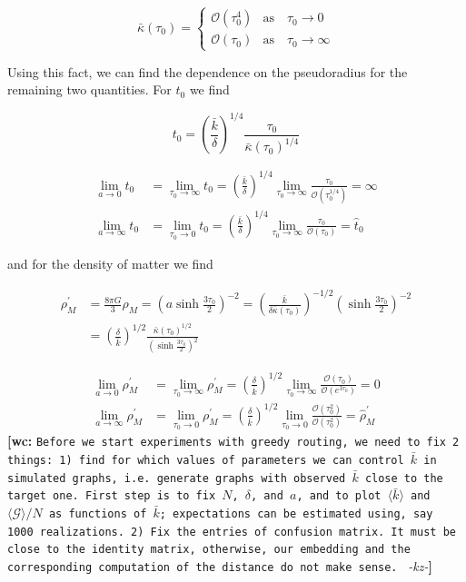 \documentclass[preprint,notitlepage,amsmath,amssymb,floatfix]{revtex4-1}
\newcommand{\XXX}[3]{{\bf [#1: } {\tt #3} {\it -#2-}{\bf ]}}
\begin{document}
\begin{equation}
\bar{\kappa}\left(\tau_0\right) = 
\begin{cases}
\mathcal{O}\left(\tau_0^4\right) & \mathrm{as}\quad \tau_0\to 0 \\
\mathcal{O}\left(\tau_0\right) & \mathrm{as}\quad \tau_0\to\infty
\end{cases}
\end{equation}

\noindent Using this fact, we can find the dependence on the pseudoradius for the remaining two quantities.  For $t_0$ we find

\begin{equation}
t_0 = \left(\frac{\bar k}{\delta}\right)^{1/4}\frac{\tau_0}{\bar\kappa\left(\tau_0\right)^{1/4}}
\end{equation}

\begin{align}
\lim_{a\to 0} t_0 &= \lim_{\tau_0\to\infty} t_0 = \left(\frac{\bar k}{\delta}\right)^{1/4}\lim_{\tau_0\to\infty}\frac{\tau_0}{\mathcal{O}\left(\tau_0^{1/4}\right)} = \infty \\
\lim_{a\to\infty} t_0 &= \lim_{\tau_0\to 0} t_0 = \left(\frac{\bar k}{\delta}\right)^{1/4}\lim_{\tau_0\to\infty}\frac{\tau_0}{\mathcal{O}\left(\tau_0\right)} = \hat{t}_0
\end{align}

\noindent and for the density of matter we find

\begin{equation}
\begin{split}
\rho_M^\prime &= \frac{8\pi G}{3}\rho_M = \left(a\sinh\frac{3\tau_0}{2}\right)^{-2} = \left(\frac{\bar k}{\delta\bar\kappa\left(\tau_0\right)}\right)^{-1/2}\left(\sinh\frac{3\tau_0}{2}\right)^{-2} \\
&= \left(\frac{\delta}{\bar k}\right)^{1/2}\frac{\bar\kappa\left(\tau_0\right)^{1/2}}{\left(\sinh\frac{3\tau_0}{2}\right)^2}
\end{split}
\end{equation}

\begin{align}
\lim_{a\to 0}\rho_M^\prime &= \lim_{\tau_0\to\infty}\rho_M^\prime = \left(\frac{\delta}{\bar k}\right)^{1/2}\lim_{\tau_0\to\infty}\frac{\mathcal{O}\left(\tau_0\right)}{\mathcal{O}\left(e^{3\tau_0}\right)} = 0 \\
\lim_{a\to\infty}\rho_M^\prime &= \lim_{\tau_0\to 0}\rho_M^\prime = \left(\frac{\delta}{\bar k}\right)^{1/2}\lim_{\tau_0\to 0}\frac{\mathcal{O}\left(\tau_0^2\right)}{\mathcal{O}\left(\tau_0^2\right)} = \hat{\rho}_M^\prime
\end{align}
\XXX{wc}{kz}{Before we start experiments with greedy routing, we need to fix 2 things: 1) find for which values of parameters we can control $\bar{k}$ in simulated graphs, i.e. generate graphs with observed $\bar{k}$ close to the target one. First step is to fix $N$, $\delta$, and $a$, and to plot $\langle\bar{k}\rangle$ and $\langle\mathcal{G}\rangle/N$ as functions of $\bar{k}$; expectations can be estimated using, say 1000 realizations. 2) Fix the entries of confusion matrix. It must be close to the identity matrix, otherwise, our embedding and the corresponding computation of the distance do not make sense.   }
\end{document}
